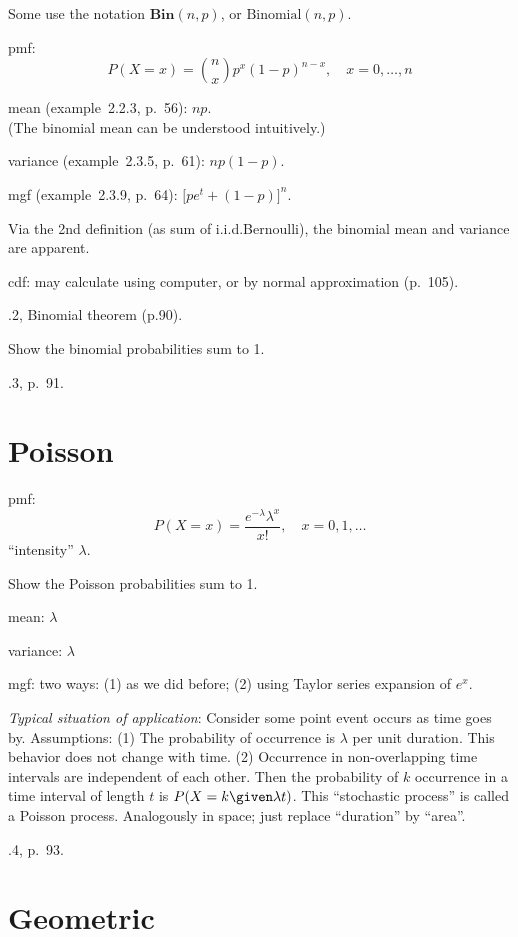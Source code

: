 \documentclass[12pt]{article}
\begin{document}
Some use the notation $\textbf{Bin}(n,p)$, or $\text{Binomial}(n,p)$.

pmf:
\[
P(X = x) = {n\choose x} p^x (1-p)^{n-x}
,\quad
x = 0,\dotsc,n
\]

mean (example~2.2.3, p.~56): $np$.\\
(The binomial mean can be understood intuitively.)

variance (example~2.3.5, p.~61): $np(1-p)$.

mgf (example~2.3.9, p.~64): $\bigl[pe^t + (1-p)\bigr]^n$.

Via the 2nd definition (as sum of i.i.d.\@ Bernoulli),
the binomial mean and variance are apparent.

cdf: may calculate using computer, or by normal approximation (p.~105).

.2, Binomial theorem (p.90).

\exercise Show the binomial probabilities sum to 1.

.3, p.~91.

\section{Poisson}

pmf:
\[
P(X = x) = \frac{e^{-\lambda}\lambda^x}{x!}
,\quad
x = 0, 1,\dotso
\]
``intensity'' $\lambda$.

\exercise Show the Poisson probabilities sum to 1.

mean: $\lambda$

variance: $\lambda$

mgf: two ways:
(1) as we did before;
(2) using Taylor series expansion of $e^x$.

\emph{Typical situation of application}:
Consider some point event occurs as time goes by.
Assumptions: (1) The probability of occurrence is $\lambda$ per
unit duration. This behavior does not change with time. (2)
Occurrence in non-overlapping time intervals are independent
of each other. Then the probability of $k$ occurrence in a time
interval of length $t$ is $P(X = k\given \lambda t)$.
This “stochastic process” is called a Poisson process.
Analogously in space; just replace ``duration'' by ``area''.

.4, p.~93.

\section{Geometric}
\end{document}
